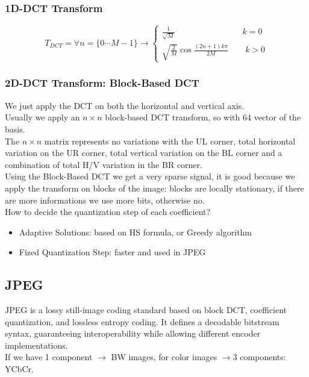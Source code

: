 \subsubsection{1D-DCT Transform}
$$T_{DCT} = \forall n = \{0 \cdots M-1\} \to \begin{cases}
    \frac{1}{\sqrt{M}} \qquad\qquad\qquad\qquad k=0\\
    \sqrt{\frac{2}{M}}\cos\frac{\left(2n+1\right)k\pi}{2M} \qquad k>0
\end{cases}$$
\subsubsection{2D-DCT Transform: Block-Based DCT}
We just apply the DCT on both the horizontal and vertical axis.\\
Usually we apply an $n\times n$ block-based DCT transform, so with 64 vector of the basis.\\
The $n\times n$ matrix represents no variations with the UL corner, total horizontal variation on the UR corner, total vertical variation on the BL corner and a combination of total H/V variation in the BR corner.\\
Using the Block-Based DCT we get a very sparse signal, it is good because we apply the transform on blocks of the image: blocks are locally stationary, if there are more informations we use more bits, otherwise no.\\
How to decide the quantization step of each coefficient?
\begin{itemize}
    \item Adaptive Solutions: based on HS formula, or Greedy algorithm
    \item Fized Quantization Step: faster and used in JPEG
\end{itemize}
\subsection{JPEG}
JPEG is a lossy still-image coding standard based on block DCT, coefficient quantization, and lossless entropy coding. It defines a decodable bitstream syntax, guaranteeing interoperability while allowing different encoder implementations.\\
If we have 1 component $\to$ BW images, for color images $\to 3$ components: YCbCr.
